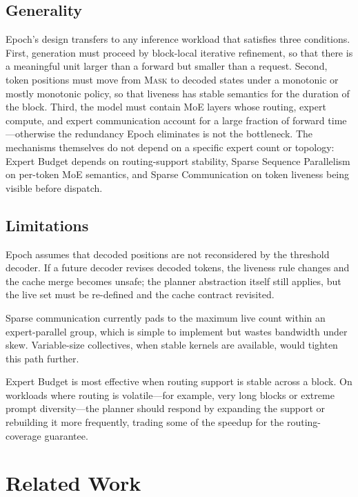 \documentclass[sigconf,review,anonymous, 10pt]{acmart}
\newcommand{\sys}{Epoch}
\newcommand{\mask}{\textsc{Mask}}
\begin{document}
\subsection{Generality}

\sys{}'s design transfers to any inference workload that satisfies three conditions.
First, generation must proceed by block-local iterative refinement, so that there is a meaningful unit larger than a forward but smaller than a request.
Second, token positions must move from \mask{} to decoded states under a monotonic or mostly monotonic policy, so that liveness has stable semantics for the duration of the block.
Third, the model must contain MoE layers whose routing, expert compute, and expert communication account for a large fraction of forward time---otherwise the redundancy \sys{} eliminates is not the bottleneck.
The mechanisms themselves do not depend on a specific expert count or topology: Expert Budget depends on routing-support stability, Sparse Sequence Parallelism on per-token MoE semantics, and Sparse Communication on token liveness being visible before dispatch.

\subsection{Limitations}

\sys{} assumes that decoded positions are not reconsidered by the threshold decoder.
If a future decoder revises decoded tokens, the liveness rule changes and the cache merge becomes unsafe; the planner abstraction itself still applies, but the live set must be re-defined and the cache contract revisited.

Sparse communication currently pads to the maximum live count within an expert-parallel group, which is simple to implement but wastes bandwidth under skew.
Variable-size collectives, when stable kernels are available, would tighten this path further.

Expert Budget is most effective when routing support is stable across a block.
On workloads where routing is volatile---for example, very long blocks or extreme prompt diversity---the planner should respond by expanding the support or rebuilding it more frequently, trading some of the speedup for the routing-coverage guarantee.

\section{Related Work}
\end{document}
